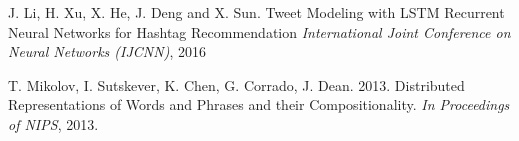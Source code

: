 \documentclass[journal, a4paper]{IEEEtran}
\begin{document}
\begin{thebibliography}{5}

	J. Li, H. Xu, X. He, J. Deng and X. Sun. Tweet Modeling with LSTM Recurrent Neural
	Networks for Hashtag Recommendation {\em International Joint Conference on Neural Networks (IJCNN)}, 2016

	T. Mikolov, I. Sutskever, K. Chen, G. Corrado, J. Dean. 2013. Distributed Representations of Words and Phrases and their Compositionality. {\em In Proceedings of NIPS}, 2013.

\end{thebibliography}

\end{document}
